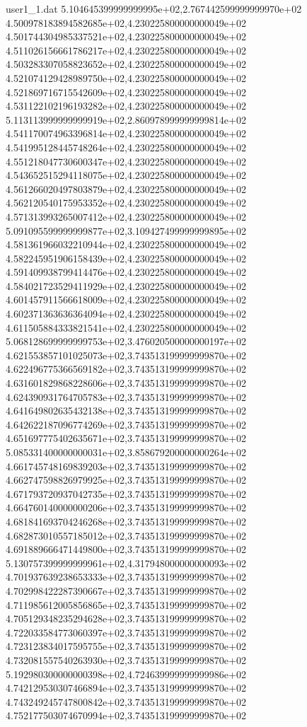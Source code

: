 \begin{filecontents}{user1_1.dat}
5.104645399999999995e+02,2.767442599999999970e+02
4.500978183894582685e+02,4.230225800000000049e+02
4.501744304985337521e+02,4.230225800000000049e+02
4.511026156661786217e+02,4.230225800000000049e+02
4.503283307058823652e+02,4.230225800000000049e+02
4.521074129428989750e+02,4.230225800000000049e+02
4.521869716715542609e+02,4.230225800000000049e+02
4.531122102196193282e+02,4.230225800000000049e+02
5.113113999999999919e+02,2.860978999999999814e+02
4.541170074963396814e+02,4.230225800000000049e+02
4.541995128445748264e+02,4.230225800000000049e+02
4.551218047730600347e+02,4.230225800000000049e+02
4.543652515294118075e+02,4.230225800000000049e+02
4.561266020497803879e+02,4.230225800000000049e+02
4.562120540175953352e+02,4.230225800000000049e+02
4.571313993265007412e+02,4.230225800000000049e+02
5.091095599999999877e+02,3.109427499999999895e+02
4.581361966032210944e+02,4.230225800000000049e+02
4.582245951906158439e+02,4.230225800000000049e+02
4.591409938799414476e+02,4.230225800000000049e+02
4.584021723529411929e+02,4.230225800000000049e+02
4.601457911566618009e+02,4.230225800000000049e+02
4.602371363636364094e+02,4.230225800000000049e+02
4.611505884333821541e+02,4.230225800000000049e+02
5.068128699999999753e+02,3.476020500000000197e+02
4.621553857101025073e+02,3.743513199999999870e+02
4.622496775366569182e+02,3.743513199999999870e+02
4.631601829868228606e+02,3.743513199999999870e+02
4.624390931764705783e+02,3.743513199999999870e+02
4.641649802635432138e+02,3.743513199999999870e+02
4.642622187096774269e+02,3.743513199999999870e+02
4.651697775402635671e+02,3.743513199999999870e+02
5.085331400000000031e+02,3.858679200000000264e+02
4.661745748169839203e+02,3.743513199999999870e+02
4.662747598826979925e+02,3.743513199999999870e+02
4.671793720937042735e+02,3.743513199999999870e+02
4.664760140000000206e+02,3.743513199999999870e+02
4.681841693704246268e+02,3.743513199999999870e+02
4.682873010557185012e+02,3.743513199999999870e+02
4.691889666471449800e+02,3.743513199999999870e+02
5.130757399999999961e+02,4.317948000000000093e+02
4.701937639238653333e+02,3.743513199999999870e+02
4.702998422287390667e+02,3.743513199999999870e+02
4.711985612005856865e+02,3.743513199999999870e+02
4.705129348235294628e+02,3.743513199999999870e+02
4.722033584773060397e+02,3.743513199999999870e+02
4.723123834017595755e+02,3.743513199999999870e+02
4.732081557540263930e+02,3.743513199999999870e+02
5.192980300000000398e+02,4.724639999999999986e+02
4.742129530307466894e+02,3.743513199999999870e+02
4.743249245747800842e+02,3.743513199999999870e+02
4.752177503074670994e+02,3.743513199999999870e+02

\end{filecontents}
